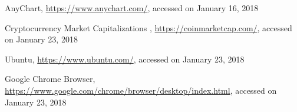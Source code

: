 \begin{thebibliography}{99}
 AnyChart, \url{https://www.anychart.com/}, accessed on January 16, 2018

 Cryptocurrency Market Capitalizations , \url{https://coinmarketcap.com/}, accessed on January 23, 2018

 Ubuntu, \url{https://www.ubuntu.com/}, accessed on January 23, 2018

 Google Chrome Browser, \url{https://www.google.com/chrome/browser/desktop/index.html}, accessed on January 23, 2018

\end{thebibliography}

